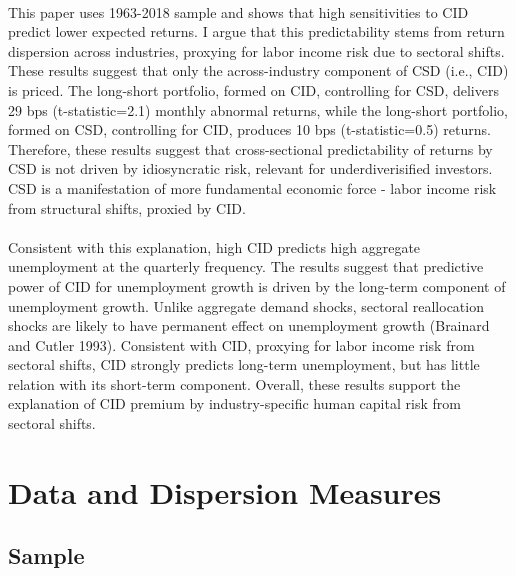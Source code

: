 \documentclass[12pt]{article}
\begin{document}
\paragraph{}
This paper uses 1963-2018 sample and shows that high sensitivities to CID predict lower expected returns. I argue that this predictability stems from return dispersion across industries, proxying for labor income risk due to sectoral shifts. These results suggest that only the across-industry component of CSD (i.e., CID) is priced. The long-short portfolio, formed on CID, controlling for CSD, delivers 29 bps (t-statistic=2.1) monthly abnormal returns, while the long-short portfolio, formed on CSD, controlling for CID, produces 10 bps (t-statistic=0.5) returns. Therefore, these results suggest that cross-sectional predictability of returns by CSD is not driven by idiosyncratic risk, relevant for underdiverisified investors. CSD is a manifestation of more fundamental economic force - labor income risk from structural shifts, proxied by CID. 
\paragraph{}
Consistent with this explanation, high CID predicts high aggregate unemployment at the quarterly frequency. The results suggest that predictive power of CID for unemployment growth is driven by the long-term component of unemployment growth. Unlike aggregate demand shocks, sectoral reallocation shocks are likely to have permanent effect on unemployment growth (Brainard and Cutler 1993). Consistent with CID, proxying for labor income risk from sectoral shifts, CID strongly predicts long-term unemployment, but has little relation with its short-term component.  Overall, these results support the explanation of CID premium by industry-specific human capital risk from sectoral shifts.



\section{Data and Dispersion Measures} \label{sec:Model}

\subsection{Sample}
\end{document}
